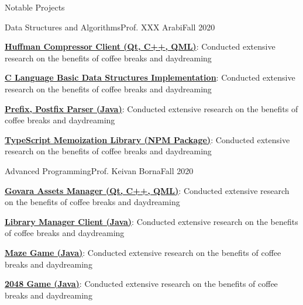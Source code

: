 \documentclass[]{main}
\begin{document}
\begin{section}{Notable Projects}
 \begin{subsection}{Data Structures and Algorithms}{Prof. XXX Arabi}{Fall 2020}{}
     \item \textbf{\href{https://github.com/ckoliber/kuffman}{Huffman Compressor Client (Qt, C++, QML)}}: Conducted extensive research on the benefits of coffee breaks and daydreaming
     \item \textbf{\href{https://github.com/ckoliber/memoizor}{C Language Basic Data Structures Implementation}}: Conducted extensive research on the benefits of coffee breaks and daydreaming
     \item \textbf{\href{https://github.com/ckoliber/XFixToYFix}{Prefix, Postfix Parser (Java)}}: Conducted extensive research on the benefits of coffee breaks and daydreaming
     \item \textbf{\href{https://github.com/ckoliber/memoizor}{TypeScript Memoization Library (NPM Package)}}: Conducted extensive research on the benefits of coffee breaks and daydreaming
 \end{subsection}

 \begin{subsection}{Advanced Programming}{Prof. Keivan Borna}{Fall 2020}{}
     \item \textbf{\href{https://github.com/ckoliber/govara}{Govara Assets Manager (Qt, C++, QML)}}: Conducted extensive research on the benefits of coffee breaks and daydreaming
     \item \textbf{\href{https://github.com/ckoliber/LibraryManager}{Library Manager Client (Java)}}: Conducted extensive research on the benefits of coffee breaks and daydreaming
     \item \textbf{\href{https://github.com/ckoliber/Maze}{Maze Game (Java)}}: Conducted extensive research on the benefits of coffee breaks and daydreaming
     \item \textbf{\href{https://github.com/ckoliber/2048}{2048 Game (Java)}}: Conducted extensive research on the benefits of coffee breaks and daydreaming
 \end{subsection}
\end{section}



\end{document}
